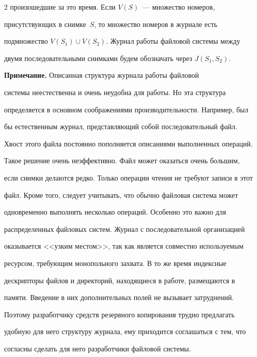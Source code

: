 \begin{multicols}{2}
произошедшие за это время. Если $V(S)$~--- множество номеров, 


присутствующих в снимке~$S$, то множество номеров в журнале есть 


подмножество $V(S_1)\cup V(S_2)$. Журнал работы файловой сис\-те\-мы между 


двумя последовательными снимками будем обозначать через $J(S_1, S_2)$.


      


      \smallskip


\noindent


{\sf \textbf{Примечание.} Описанная структура журнала работы файловой 


системы  неестественна и очень неудобна для работы. Но эта структура 


определяется в основном соображениями производительности. Напри\-мер, был 


бы естественным журнал, пред\-став\-ля\-ющий собой последовательный файл. 


Хвост этого файла постоянно пополняется описаниями выполненных операций. 


Такое решение очень неэффективно. Файл может оказаться очень большим, 


если снимки делаются редко. Только операции чтения не требуют записи в этот 


файл. Кроме того, следует учиты\-вать, что обычно файловая система может 


одновременно выполнять несколько операций. Особенно это важно для 


распределенных файловых систем. Журнал с последовательной организацией 


оказывается <<узким местом>>, так как является совместно используемым 


ресурсом, требующим монопольного захвата. В то же время индексные 


дескрипторы файлов и директорий, находящиеся в работе, размещаются в 


памяти. Введение в них дополнительных полей не вызывает затруднений. 


Поэтому разработчику средств резервного копирования трудно предлагать 


удобную для него структуру журнала, ему приходится соглашаться с тем, что 


согласны сделать для него разработчики файловой системы.}






\end{multicols}
